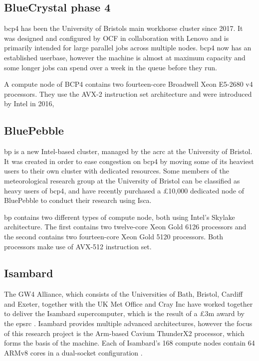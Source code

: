 \documentclass[a4paper,11pt]{report}
\begin{document}

\subsection{BlueCrystal phase 4}
\gls{bcp4} has been the University of Bristols main workhorse cluster since 2017. It was designed and configured by OCF in collaboration with Lenovo and is primarily intended for large parallel jobs across multiple nodes. \gls{bcp4} now has an established userbase, however the machine is almost at maximum capacity and some longer jobs can spend over a week in the queue before they run.
\par
A compute node of BCP4 contains two fourteen-core Broadwell Xeon E5-2680 v4 processors. They use the AVX-2 instruction set architecture and were introduced by Intel in 2016, 

\subsection{BluePebble}
\gls{bp} is a new Intel-based cluster, managed by the \gls{acrc} at the University of Bristol. It was created in order to ease congestion on \gls{bcp4} by moving some of its heaviest users to their own cluster with dedicated resources. Some members of the meteorological research group at the University of Bristol can be classified as heavy users of \gls{bcp4}, and have recently purchased a £10,000 dedicated node of BluePebble to conduct their research using Isca. 
\par
\gls{bp} contains two different types of compute node, both using Intel's Skylake architecture. The first contains two twelve-core Xeon Gold 6126 processors and the second contains two fourteen-core Xeon Gold 5120 processors. Both processors make use of AVX-512 instruction set. 


\subsection{Isambard}
The GW4 Alliance, which consists of the Universities of Bath, Bristol, Cardiff and Exeter, together with the UK Met Office and Cray Inc have worked together to deliver the Isambard supercomputer, which is the result of a £3m award by the \gls{epsrc} \cite{arm2018white}. Isambard provides multiple advanced architectures, however the focus of this research project is the Arm-based Cavium ThunderX2 processor, which forms the basis of the machine. Each of Isambard's 168 compute nodes contain 64 ARMv8 cores in a dual-socket configuration \cite{thunderprocessor2018brief}. 
\end{document}
